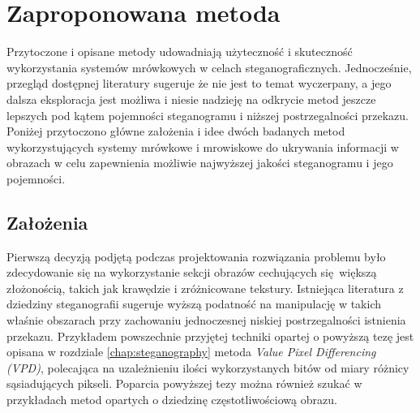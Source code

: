 {    \section{Zaproponowana metoda}
    {
        Przytoczone i opisane metody udowadniają użyteczność i skuteczność wykorzystania systemów mrówkowych w celach
        steganograficznych. Jednocześnie, przegląd dostępnej literatury sugeruje że nie jest to temat wyczerpany, a jego
        dalsza eksploracja jest możliwa i niesie nadzieję na odkrycie metod jeszcze lepszych pod kątem pojemności
        steganogramu i niższej postrzegalności przekazu. Poniżej przytoczono główne założenia i idee dwóch badanych
        metod wykorzystujących systemy mrówkowe i mrowiskowe do ukrywania informacji w obrazach w celu zapewnienia
        możliwie najwyższej jakości steganogramu i jego pojemności.

        \subsection{Założenia}
        {
            Pierwszą decyzją podjętą podczas projektowania rozwiązania problemu było zdecydowanie się na wykorzystanie
            sekcji obrazów cechujących się większą złożonością, takich jak krawędzie i zróżnicowane tekstury. Istniejąca
            literatura z dziedziny steganografii sugeruje wyższą podatność na manipulację w takich właśnie obszarach
            przy zachowaniu jednoczesnej niskiej postrzegalności istnienia przekazu. Przykładem powszechnie przyjętej
            techniki opartej o powyższą tezę jest opisana w rozdziale \ref{chap:steganography} metoda \textit{Value
            Pixel Differencing (VPD)}\cite{Wu2003ASM}, polecająca na uzależnieniu ilości wykorzystanych bitów od miary
            różnicy sąsiadujących pikseli. Poparcia powyższej tezy można również szukać w przykładach metod opartych o
            dziedzinę częstotliwościową obrazu\cite{Xuan2005LosslessDH}.

}}}
